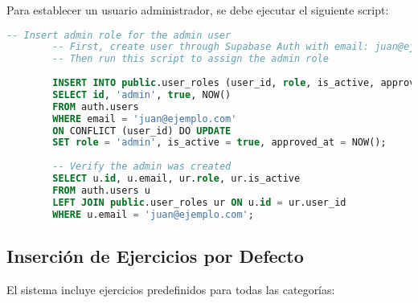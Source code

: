 \documentclass[12pt,a4paper]{article}
\begin{document}
	Para establecer un usuario administrador, se debe ejecutar el siguiente script:
	
	\begin{lstlisting}[language=SQL, caption=Script para crear usuario administrador]
		-- Insert admin role for the admin user
		-- First, create user through Supabase Auth with email: juan@ejemplo.com and password: 123456
		-- Then run this script to assign the admin role
		
		INSERT INTO public.user_roles (user_id, role, is_active, approved_at)
		SELECT id, 'admin', true, NOW()
		FROM auth.users
		WHERE email = 'juan@ejemplo.com'
		ON CONFLICT (user_id) DO UPDATE
		SET role = 'admin', is_active = true, approved_at = NOW();
		
		-- Verify the admin was created
		SELECT u.id, u.email, ur.role, ur.is_active
		FROM auth.users u
		LEFT JOIN public.user_roles ur ON u.id = ur.user_id
		WHERE u.email = 'juan@ejemplo.com';
	\end{lstlisting}
	
	\subsection{Inserción de Ejercicios por Defecto}
	
	El sistema incluye ejercicios predefinidos para todas las categorías:
	
\end{document}
